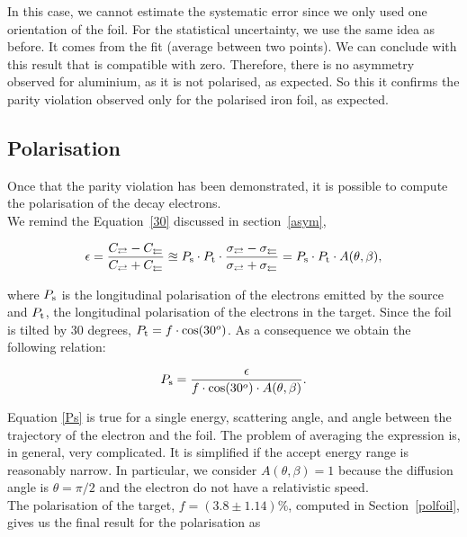 \documentclass[10pt,swedish, openany]{book}
\begin{document}
In this case, we cannot estimate the systematic error since we only used one orientation of the foil. For the statistical uncertainty, we use the same idea as before. It comes from the fit (average between two points). We can conclude with this result that is compatible with zero. Therefore, there is no asymmetry observed for aluminium, as it is not polarised, as expected. So this it confirms the parity violation observed only for the polarised iron foil, as expected.

\subsection{Polarisation} 

Once that the parity violation has been demonstrated, it is possible to compute the polarisation of the decay electrons.\\

We remind the Equation~\ref{30} discussed in section~\ref{asym}, 

\begin{equation}\label{30}
\epsilon=\frac{C_{\rightleftarrows}-C_{\leftleftarrows}}{C_{\rightleftarrows}+C_{\leftleftarrows}} \approxeq P_{\rm s}  \cdot  P_{\rm t}  \cdot \frac{\sigma_{\rightleftarrows}-\sigma_{\leftleftarrows}}{\sigma_{\rightleftarrows}+\sigma_{\leftleftarrows}}= P_{\rm s} \cdot P_{\rm t} \cdot A(\theta,\beta),
\end{equation}

where $P_{\rm s}$ is the longitudinal polarisation of the electrons emitted by the source and $P_{\rm t}$, the longitudinal polarisation of the electrons in the target. Since the foil is tilted by 30 degrees, $P_{\rm t} = f\cdot \cos(30^o)$. As a consequence we obtain the following relation:

\begin{equation}\label{Ps}
    P_{\rm s} = \frac{\epsilon}{f \cdot \cos(30^o) \cdot A(\theta, \beta)}.
\end{equation}

Equation \ref{Ps} is true for a single energy, scattering angle, and angle between the trajectory of the electron and the foil. The problem of averaging the expression is, in general, very complicated. It is simplified if the accept energy range is reasonably narrow. In particular, we consider $A(\theta, \beta)=1$ because the diffusion angle is $\theta = \pi/2$ and the electron do not have a relativistic speed.\\

The polarisation of the target, $f=(3.8 \pm 1.14)\%$, computed in Section~\ref{polfoil}, gives us the final result for the polarisation as
\end{document}
